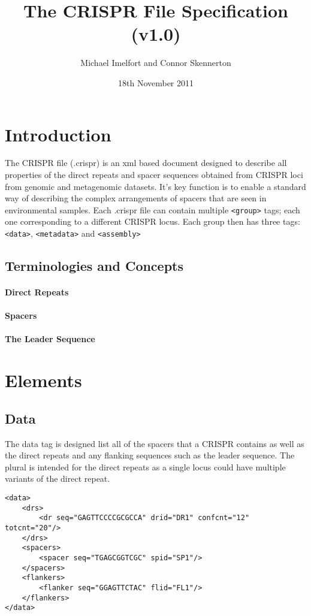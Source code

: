 \documentclass[11pt]{article} %
\title{The CRISPR File Specification (v1.0)}
\author{Michael Imelfort and Connor Skennerton}
\date{18th November 2011} %
\begin{document}
\maketitle

\section{Introduction}

The CRISPR file (.crispr) is an xml based document designed to describe all properties of the direct repeats and spacer sequences obtained from CRISPR loci from genomic and metagenomic datasets.  It's key function is to enable a standard way of describing the complex arrangements of spacers that are seen in environmental samples.  Each .crispr file can contain multiple  \lstinline[language=XML_new]$<group>$   tags; each one corresponding to a different CRISPR locus.  Each group then has three tags: \lstinline[language=XML_new]$<data>$, \lstinline[language=XML_new]$<metadata>$ and \lstinline[language=XML_new]$<assembly>$ 
\subsection{Terminologies and Concepts}
\paragraph{Direct Repeats}
\paragraph{Spacers}
\paragraph{The Leader Sequence}
\section{Elements}
\subsection{Data}
The data tag is designed list all of the spacers that a CRISPR contains as well as the direct repeats and any flanking sequences such as the leader sequence.  The plural is intended for the direct repeats as a single locus could have multiple variants of the direct repeat.

\begin{lstlisting}[language=XML_new]
<data>
	<drs>
		<dr seq="GAGTTCCCCGCGCCA" drid="DR1" confcnt="12" totcnt="20"/>
	</drs>
	<spacers>
		<spacer seq="TGAGCGGTCGC" spid="SP1"/>
	</spacers>
	<flankers>
		<flanker seq="GGAGTTCTAC" flid="FL1"/>
	</flankers>
</data>
\end{lstlisting}
\end{document}
